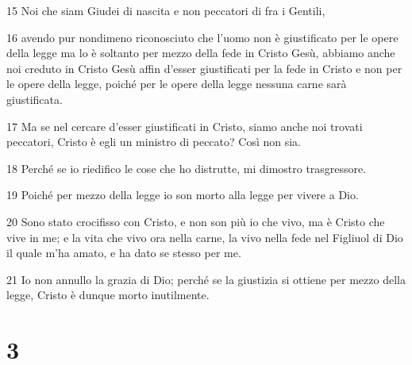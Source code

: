 \par 15 Noi che siam Giudei di nascita e non peccatori di fra i Gentili,
\par 16 avendo pur nondimeno riconosciuto che l'uomo non è giustificato per le opere della legge ma lo è soltanto per mezzo della fede in Cristo Gesù, abbiamo anche noi creduto in Cristo Gesù affin d'esser giustificati per la fede in Cristo e non per le opere della legge, poiché per le opere della legge nessuna carne sarà giustificata.
\par 17 Ma se nel cercare d'esser giustificati in Cristo, siamo anche noi trovati peccatori, Cristo è egli un ministro di peccato? Così non sia.
\par 18 Perché se io riedifico le cose che ho distrutte, mi dimostro trasgressore.
\par 19 Poiché per mezzo della legge io son morto alla legge per vivere a Dio.
\par 20 Sono stato crocifisso con Cristo, e non son più io che vivo, ma è Cristo che vive in me; e la vita che vivo ora nella carne, la vivo nella fede nel Figliuol di Dio il quale m'ha amato, e ha dato se stesso per me.
\par 21 Io non annullo la grazia di Dio; perché se la giustizia si ottiene per mezzo della legge, Cristo è dunque morto inutilmente.

\chapter{3}


